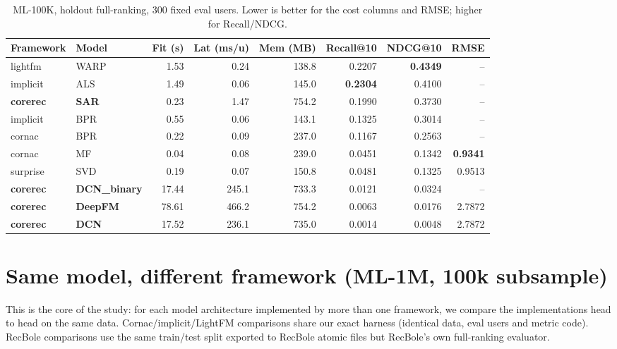 \documentclass[10pt]{article}
\begin{document}
\begin{table}[h]\centering\small
\begin{tabular}{llrrrrrr}
\toprule
Framework & Model & Fit (s) & Lat (ms/u) & Mem (MB) & Recall@10 & NDCG@10 & RMSE \\
\midrule
lightfm   & WARP       & 1.53  & 0.24  & 138.8 & 0.2207 & \textbf{0.4349} & -- \\
implicit  & ALS        & 1.49  & 0.06  & 145.0 & \textbf{0.2304} & 0.4100 & -- \\
\textbf{corerec} & \textbf{SAR} & 0.23 & 1.47 & 754.2 & 0.1990 & 0.3730 & -- \\
implicit  & BPR        & 0.55  & 0.06  & 143.1 & 0.1325 & 0.3014 & -- \\
cornac    & BPR        & 0.22  & 0.09  & 237.0 & 0.1167 & 0.2563 & -- \\
cornac    & MF         & 0.04  & 0.08  & 239.0 & 0.0451 & 0.1342 & \textbf{0.9341} \\
surprise  & SVD        & 0.19  & 0.07  & 150.8 & 0.0481 & 0.1325 & 0.9513 \\
\textbf{corerec} & \textbf{DCN\_binary} & 17.44 & 245.1 & 733.3 & 0.0121 & 0.0324 & -- \\
\textbf{corerec} & \textbf{DeepFM} & 78.61 & 466.2 & 754.2 & 0.0063 & 0.0176 & 2.7872 \\
\textbf{corerec} & \textbf{DCN} & 17.52 & 236.1 & 735.0 & 0.0014 & 0.0048 & 2.7872 \\
\bottomrule
\end{tabular}
\caption{ML-100K, holdout full-ranking, 300 fixed eval users. Lower is better for
the cost columns and RMSE; higher for Recall/NDCG.}
\label{tab:ml100k}
\end{table}

\section{Same model, different framework (ML-1M, 100k subsample)}
\label{sec:same}
This is the core of the study: for each model architecture implemented by more
than one framework, we compare the implementations head to head on the same data.
Cornac/implicit/LightFM comparisons share our exact harness (identical data, eval
users and metric code). RecBole comparisons use the same train/test split exported
to RecBole atomic files but RecBole's own full-ranking evaluator.
\end{document}
